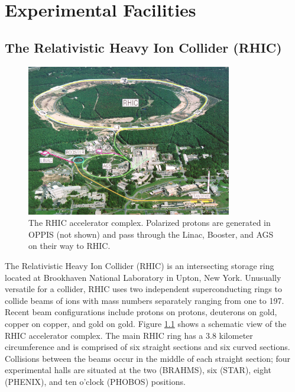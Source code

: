 \chapter{Experimental Facilities}

\section{The Relativistic Heavy Ion Collider (RHIC)}

\begin{figure}
  \begin{center}
    \includegraphics[width=0.8\textwidth]{figures/rhic-from-above}
  \end{center}
  \caption{The RHIC accelerator complex.  Polarized protons are generated in OPPIS (not shown) and pass through the Linac, Booster, and AGS on their way to RHIC.}
  \label{fig:rhic}
\end{figure}

The Relativistic Heavy Ion Collider (RHIC) is an intersecting storage ring located at Brookhaven National Laboratory in Upton, New York.  Unusually versatile for a collider, RHIC uses two independent superconducting rings to collide beams of ions with mass numbers separately ranging from one to 197.  Recent beam configurations include protons on protons, deuterons on gold, copper on copper, and gold on gold.  Figure \ref{fig:rhic} shows a schematic view of the RHIC accelerator complex.  The main RHIC ring has a 3.8 kilometer circumference and is comprised of six straight sections and six curved sections.  Collisions between the beams occur in the middle of each straight section; four experimental halls are situated at the two (BRAHMS), six (STAR), eight (PHENIX), and ten o'clock (PHOBOS) positions.

